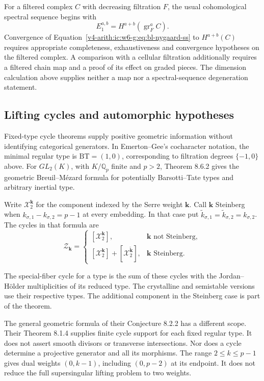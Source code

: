 For a filtered complex $C$ with decreasing filtration $F$, the
usual cohomological spectral sequence begins with
\begin{equation}
\label{v4-arith:ic:w6-g:eq:bl-nygaard-ss}
 E_1^{a,b}=H^{a+b}(\operatorname{gr}_F^a C).
\end{equation}
Convergence of Equation~\eqref{v4-arith:ic:w6-g:eq:bl-nygaard-ss}
to $H^{a+b}(C)$ requires appropriate completeness,
exhaustiveness and convergence hypotheses on the filtered complex.
A comparison with a cellular filtration additionally requires a
filtered chain map and a proof of its effect on graded pieces.
The dimension calculation above supplies neither a map nor a
spectral-sequence degeneration statement.


\subsection{Lifting cycles and automorphic hypotheses}

Fixed-type cycle theorems supply positive geometric information
without identifying categorical generators.
In Emerton--Gee's cocharacter notation, the minimal regular type
is \(\mathrm{BT}=(1,0)\), corresponding to filtration degrees
\(\{-1,0\}\) above.
For \(GL_2(K)\), with \(K/\mathbb Q_p\) finite and \(p>2\),
Theorem 8.6.2 gives the geometric Breuil--M\'ezard formula
for potentially Barsotti--Tate types and arbitrary inertial type.

Write \(\mathcal X_2^{\mathbf k}\) for the component indexed by
the Serre weight \(\mathbf k\).
Call \(\mathbf k\) Steinberg when
\(k_{\sigma,1}-k_{\sigma,2}=p-1\) at every embedding.
In that case put
\(\widetilde k_{\sigma,1}=\widetilde k_{\sigma,2}=k_{\sigma,2}\).
The cycles in that formula are
\[
 \mathcal Z_{\mathbf k}=
 \begin{cases}
  [\mathcal X_2^{\mathbf k}],&
          \mathbf k\text{ not Steinberg},\\
  [\mathcal X_2^{\mathbf k}]
    +[\mathcal X_2^{\widetilde{\mathbf k}}],&
          \mathbf k\text{ Steinberg}.
 \end{cases}
\]

The special-fiber cycle for a type is the sum of these cycles
with the Jordan--H\"older multiplicities of its reduced type.
The crystalline and semistable versions use their respective
types. The additional component in the Steinberg case is part
of the theorem.

The general geometric formula of their Conjecture 8.2.2 has a
different scope. Their Theorem 8.1.4 supplies finite cycle support
for each fixed regular type. It does not assert smooth divisors
or transverse intersections. Nor does a cycle determine a
projective generator and all its morphisms.
The range \(2\le k\le p-1\) gives dual weights
\((0,k-1)\), including \((0,p-2)\) at its endpoint.
It does not reduce the full supersingular lifting problem to
two weights.

